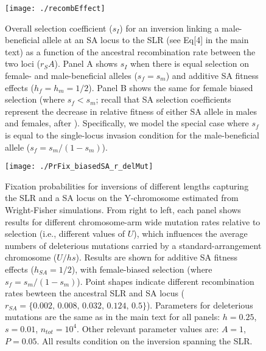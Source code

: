 \documentclass{article}
\begin{document}
\begin{appendices}
\newpage
 \begin{figure}[H]
 \centering
 \texttt{[image: ./recombEffect]}
 \caption{Overall selection coefficient ($s_I$) for an inversion linking a male-beneficial allele at an SA locus to the SLR (see Eq[4] in the main text) as a function of the ancestral recombination rate between the two loci ($r_SA$). Panel A shows $s_I$ when there is equal selection on female- and male-beneficial alleles ($s_f = s_m$) and additive SA fitness effects ($h_f = h_m = 1/2$). Panel B shows the same for female biased selection (where $s_f < s_m$; recall that SA selection coefficients represent the decrease in relative fitness of either SA allele in males and females, after \citealt{Kidwell1977}). Specifically, we model the special case where $s_f$ is equal to the single-locus invasion condition for the male-beneficial allele ($s_f = s_m / (1 - s_m)$).}
 \label{fig:recombEffect}
 \end{figure}


\newpage
 \begin{figure}[H]
 \centering
 \texttt{[image: ./PrFix\_biasedSA\_r\_delMut]}
 \caption{ Fixation probabilities for inversions of different lengths capturing the SLR and a SA locus on the Y-chromosome estimated from Wright-Fisher simulations. From right to left, each panel shows results for different chromosome-arm wide mutation rates relative to selection (i.e., different values of $U$), which influences the average numbers of deleterious mutations carried by a standard-arrangement chromosome ($U/hs$). Results are shown for additive SA fitness effects ($h_{SA} = 1/2$), with female-biased selection (where $s_f = s_m / (1 - s_m)$). Point shapes indicate different recombination rates bewteen the ancestral SLR and SA locus ($r_{SA} = \{0.002,\, 0.008,\,0.032,\,0.124,\,0.5\}$). Parameters for deleterious mutations are the same as in the main text for all panels: $h = 0.25$, $s = 0.01$, $n_{tot} = 10^4$. Other relevant parameter values are: $A = 1$, $P = 0.05$. All results condition on the inversion spanning the SLR.}
 \label{fig:PrFix-biasedSA}
 \end{figure}




\end{appendices}
\end{document}

